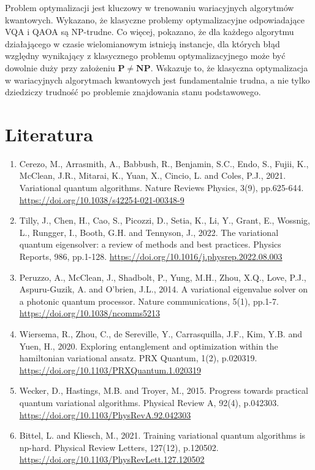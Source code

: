 \documentclass[a4paper,11pt]{article}
\begin{document}
Problem optymalizacji jest kluczowy w trenowaniu wariacyjnych algorytmów kwantowych. Wykazano, że klasyczne problemy optymalizacyjne odpowiadające VQA i QAOA są NP-trudne. Co więcej, pokazano, że dla każdego algorytmu działającego w czasie wielomianowym istnieją instancje, dla których błąd względny wynikający z klasycznego problemu optymalizacyjnego może być dowolnie duży przy założeniu $\mathbf{P} \not= \mathbf{NP}$. Wskazuje to, że klasyczna optymalizacja w wariacyjnych algorytmach kwantowych jest fundamentalnie trudna, a nie tylko dziedziczy trudność po problemie znajdowania stanu podstawowego.





\hypertarget{literatura}{%
\section*{Literatura}\label{literatura}}

\begin{enumerate}
\def\labelenumi{\arabic{enumi}.}

\item Cerezo, M., Arrasmith, A., Babbush, R., Benjamin, S.C., Endo, S., Fujii, K., McClean, J.R., Mitarai, K., Yuan, X., Cincio, L. and Coles, P.J., 2021. Variational quantum algorithms. Nature Reviews Physics, 3(9), pp.625-644. \url{https://doi.org/10.1038/s42254-021-00348-9}

\item Tilly, J., Chen, H., Cao, S., Picozzi, D., Setia, K., Li, Y., Grant, E., Wossnig, L., Rungger, I., Booth, G.H. and Tennyson, J., 2022. The variational quantum eigensolver: a review of methods and best practices. Physics Reports, 986, pp.1-128. \url{https://doi.org/10.1016/j.physrep.2022.08.003}


\item Peruzzo, A., McClean, J., Shadbolt, P., Yung, M.H., Zhou, X.Q., Love, P.J., Aspuru-Guzik, A. and O’brien, J.L., 2014. A variational eigenvalue solver on a photonic quantum processor. Nature communications, 5(1), pp.1-7. \url{https://doi.org/10.1038/ncomms5213}


\item Wiersema, R., Zhou, C., de Sereville, Y., Carrasquilla, J.F., Kim, Y.B. and Yuen, H., 2020. Exploring entanglement and optimization within the hamiltonian variational ansatz. PRX Quantum, 1(2), p.020319. \url{https://doi.org/10.1103/PRXQuantum.1.020319}

\item Wecker, D., Hastings, M.B. and Troyer, M., 2015. Progress towards practical quantum variational algorithms. Physical Review A, 92(4), p.042303. \url{https://doi.org/10.1103/PhysRevA.92.042303}



\item Bittel, L. and Kliesch, M., 2021. Training variational quantum algorithms is np-hard. Physical Review Letters, 127(12), p.120502. \url{https://doi.org/10.1103/PhysRevLett.127.120502}



\end{enumerate}
\end{document}
